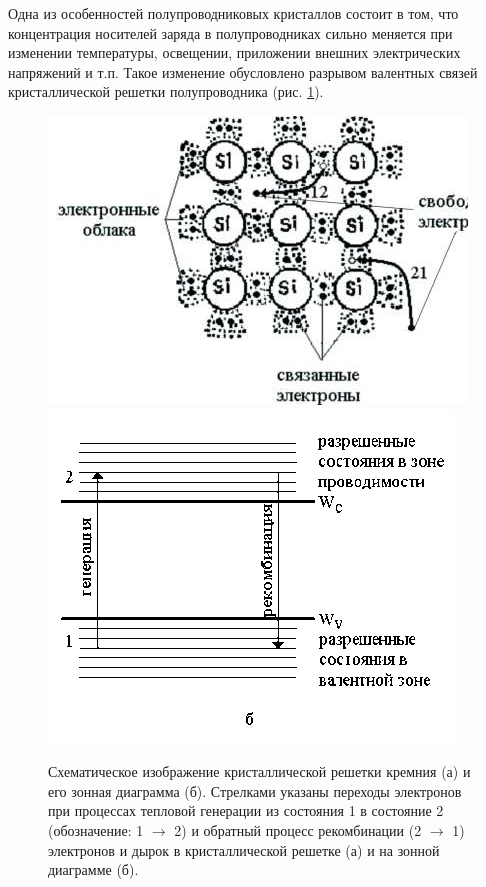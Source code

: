 \documentclass[a4paper,12pt]{article}
\begin{document}
Одна из особенностей полупроводниковых кристаллов состоит в том, что концентрация носителей заряда в полупроводниках сильно меняется при изменении температуры, освещении, приложении внешних электрических напряжений и т.п. Такое изменение обусловлено разрывом валентных связей кристаллической решетки полупроводника (рис. \ref{fig:figure1}).
\begin{figure}[H]
	\centering
	\includegraphics[]{img/1}
	\includegraphics[]{img/2}
	\caption{Схематическое изображение кристаллической решетки кремния (а) и его зонная диаграмма (б). Стрелками указаны переходы электронов при процессах тепловой генерации из состояния 1 в состояние 2 (обозначение: 1 $\to$ 2) и обратный процесс рекомбинации (2 $\to$ 1) электронов и дырок в кристаллической решетке (а) и на зонной диаграмме (б).}
	\label{fig:figure1}
\end{figure}
\end{document}

